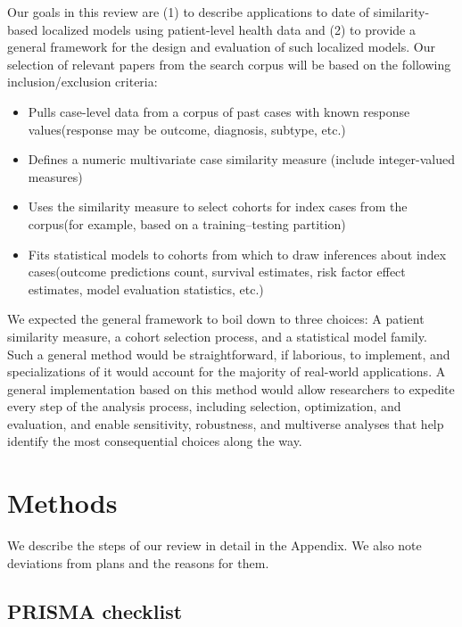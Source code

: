 \documentclass[preprint, 3p,
authoryear]{elsarticle} %
\providecommand{\tightlist}{%
  \setlength{\itemsep}{0pt}\setlength{\parskip}{0pt}}
\begin{document}
Our goals in this review are (1) to describe applications to date of
similarity-based localized models using patient-level health data and
(2) to provide a general framework for the design and evaluation of such
localized models. Our selection of relevant papers from the search
corpus will be based on the following inclusion/exclusion criteria:

\begin{itemize}
\tightlist
\item
  Pulls case-level data from a corpus of past cases with known response
  values\newline (response may be outcome, diagnosis, subtype, etc.)
\item
  Defines a numeric multivariate case similarity measure\newline
  (include integer-valued measures)
\item
  Uses the similarity measure to select cohorts for index cases from the
  corpus\newline (for example, based on a training--testing partition)
\item
  Fits statistical models to cohorts from which to draw inferences about
  index cases\newline (outcome predictions count, survival estimates,
  risk factor effect estimates, model evaluation statistics, etc.)
\end{itemize}

We expected the general framework to boil down to three choices: A
patient similarity measure, a cohort selection process, and a
statistical model family. Such a general method would be
straightforward, if laborious, to implement, and specializations of it
would account for the majority of real-world applications. A general
implementation based on this method would allow researchers to expedite
every step of the analysis process, including selection, optimization,
and evaluation, and enable sensitivity, robustness, and multiverse
analyses that help identify the most consequential choices along the
way.

\hypertarget{methods}{%
\section{Methods}\label{methods}}

We describe the steps of our review in detail in the Appendix. We also
note deviations from plans and the reasons for them.

\hypertarget{prisma-checklist}{%
\subsection{PRISMA checklist}\label{prisma-checklist}}
\end{document}
